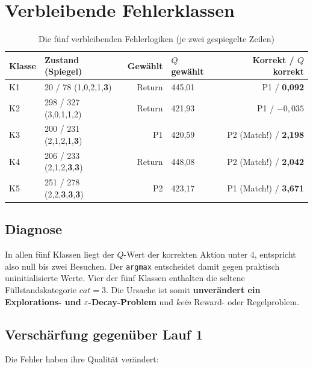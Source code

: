 \documentclass[11pt,a4paper]{article}
\begin{document}
\section{Verbleibende Fehlerklassen}

\begin{table}[htbp]
\centering
\caption{Die fünf verbleibenden Fehlerlogiken (je zwei gespiegelte Zeilen)}
\label{tab:fehler}
\small
\begin{tabular}{@{}llrlr@{}}
\toprule
\textbf{Klasse} & \textbf{Zustand (Spiegel)} & \textbf{Gewählt} &
\textbf{$Q$ gewählt} & \textbf{Korrekt / $Q$ korrekt} \\
\midrule
K1 & 20 / 78 \; (1,0,2,1,\textbf{3})            & Return & 445,01 & P1 \; / \; \textbf{0,092} \\
K2 & 298 / 327 \; (3,0,1,1,2)                   & Return & 421,93 & P1 \; / \; \textbf{$-0{,}035$} \\
K3 & 200 / 231 \; (2,1,2,1,\textbf{3})          & P1     & 420,59 & P2 (Match!) \; / \; \textbf{2,198} \\
K4 & 206 / 233 \; (2,1,2,\textbf{3},\textbf{3}) & Return & 448,08 & P2 (Match!) \; / \; \textbf{2,042} \\
K5 & 251 / 278 \; (2,2,\textbf{3},\textbf{3},\textbf{3}) & P2 & 423,17 & P1 (Match!) \; / \; \textbf{3,671} \\
\bottomrule
\end{tabular}
\end{table}

\subsection{Diagnose}

In allen fünf Klassen liegt der $Q$-Wert der korrekten Aktion unter $4$,
entspricht also null bis zwei Besuchen. Der \texttt{argmax} entscheidet
damit gegen praktisch uninitialisierte Werte. Vier der fünf Klassen
enthalten die seltene Füllstandskategorie $cat=3$. Die Ursache ist somit
\textbf{unverändert ein Explorations- und $\varepsilon$-Decay-Problem} und
\emph{kein} Reward- oder Regelproblem.

\subsection{Verschärfung gegenüber Lauf 1}

Die Fehler haben ihre Qualität verändert:
\end{document}
